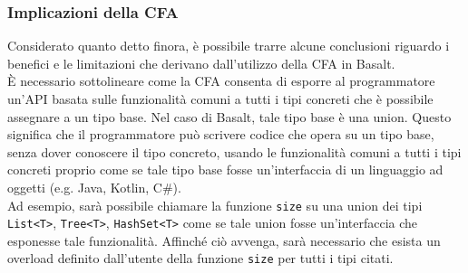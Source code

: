 \subsubsection{Implicazioni della CFA}
Considerato quanto detto finora, è possibile trarre alcune conclusioni riguardo i benefici
e le limitazioni che derivano dall'utilizzo della CFA in Basalt. \\

È necessario sottolineare come la CFA consenta di esporre al programmatore un'API basata 
sulle funzionalità comuni a tutti i tipi concreti che è possibile assegnare a un tipo 
base. Nel caso di Basalt, tale tipo base è una union. Questo significa che il programmatore
può scrivere codice che opera su un tipo base, senza dover conoscere il tipo concreto,
usando le funzionalità comuni a tutti i tipi concreti proprio come se tale tipo base fosse un'interfaccia
di un linguaggio ad oggetti (e.g. Java, Kotlin, C\#). \\

Ad esempio, sarà possibile chiamare la funzione \texttt{size} su una union dei tipi 
\texttt{List<T>}, \texttt{Tree<T>}, \texttt{HashSet<T>} come se tale union fosse un'interfaccia
che esponesse tale funzionalità. Affinché ciò avvenga, sarà necessario che esista un
overload definito dall'utente della funzione \texttt{size} per tutti i tipi citati.